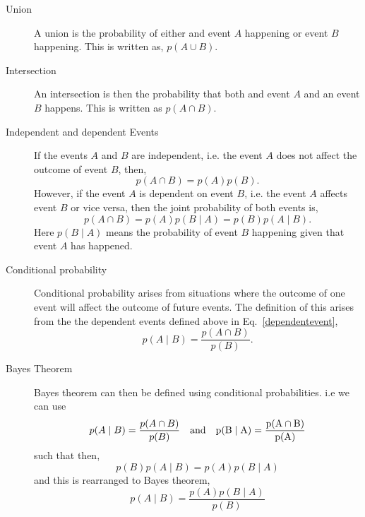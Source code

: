 \begin{description}
\item [Union]
A union is the probability of either and event $A$ happening or event $B$ happening. This is written as, $p(A \cup B)$.

\item [Intersection]
An intersection is then the probability that both and event $A$ and an event $B$ happens. This is written as $p(A \cap B)$.

\item [Independent and dependent Events]
If the events $A$ and $B$ are independent, i.e. the event $A$ does not affect the outcome of event $B$, then,
\begin{equation}
p(A \cap B) = p(A)p(B).
\end{equation}
However, if the event $A$ is dependent on event $B$, i.e. the event $A$ affects event $B$ or vice versa, then the joint probability of both events is,
\begin{equation}
\label{dependentevent}
p(A \cap B) = p(A)p(B \mid A) = p(B)p(A \mid B).
\end{equation}
Here $p(B \mid A)$ means the probability of event $B$ happening given that event $A$ has happened.

\item [Conditional probability]
Conditional probability arises from situations where the outcome of one event will affect the outcome of future events.
The definition of this arises from the the dependent events defined above in Eq.~\ref{dependentevent},
\begin{equation}
p(A \mid B) = \frac{p(A \cap B)}{p(B)}.
\end{equation}

\item [Bayes Theorem]
Bayes theorem can then be defined using conditional probabilities. i.e we can use
\begin{equation}
p(A \mid B) = \frac{p(A \cap B)}{p(B)} \quad \rm{and} \quad p(B \mid A) = \frac{p(A \cap B)}{p(A)}
\end{equation}
such that then,
\begin{equation}
p(B)p(A \mid B) = p(A)p(B \mid A)
\end{equation}
and this is rearranged to Bayes theorem,
\begin{equation}
p(A \mid B) = \frac{p(A)p(B \mid A)}{p(B)}
\end{equation}

\end{description}

